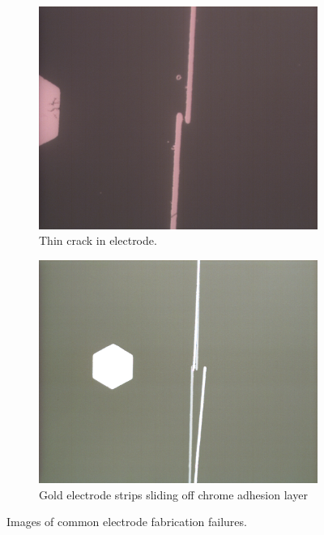 \begin{figure}[h]
\begin{subfigure}[t]{0.45\textwidth}
    \end{subfigure}
    \\
    \vspace{0.1 in}
    \begin{subfigure}[t]{0.45\textwidth}
        \centering
        \includegraphics[width=\textwidth]{images/electrodeFailureThinBreak.png}
        \caption{Thin crack in electrode.}
    \end{subfigure}
    \hfill
    \begin{subfigure}[t]{0.45\textwidth}
        \centering
        \includegraphics[width=\textwidth]{images/electrodeFailureSlide.png}
        \caption{Gold electrode strips sliding off chrome adhesion layer}
    \end{subfigure}
    \caption{Images of common electrode fabrication failures.}
    \label{fig:failed_elecftrodes_micro}
\end{figure}


